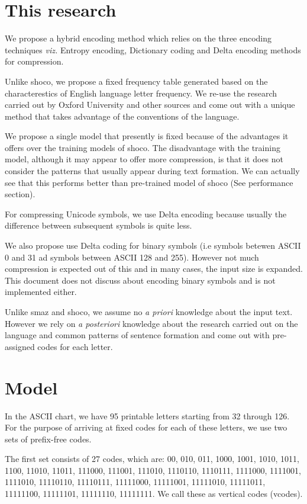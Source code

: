 \documentclass[]{article}
\begin{document}
\section{This research}

We propose a hybrid encoding method which relies on the three encoding techniques \emph{viz.} Entropy encoding, Dictionary coding and Delta encoding methods for compression.

Unlike shoco, we propose a fixed frequency table generated based on the characterestics of English language letter frequency.  We re-use the research carried out by Oxford University \cite{7} and other sources \cite{7} \cite{9} and come out with a unique method that takes advantage of the conventions of the language.

We propose a single model that presently is fixed because of the advantages it offers over the training models of shoco. The disadvantage with the training model, although it may appear to offer more compression, is that it does not consider the patterns that usually appear during text formation. We can actually see that this performs better than pre-trained model of shoco (See performance section).

For compressing Unicode symbols, we use Delta encoding because usually the difference between subsequent symbols is quite less.

We also propose use Delta coding for binary symbols (i.e symbols betewen ASCII 0 and 31 ad symbols between ASCII 128 and 255). However not much compression is expected out of this and in many cases, the input size is expanded.  This document does not discuss about encoding binary symbols and is not implemented either.

Unlike smaz and shoco, we assume no \emph{a priori} knowledge about the input text.  However we rely on \emph{a posteriori} knowledge about the research carried out on the language and common patterns of sentence formation and come out with pre-assigned codes for each letter.

\section{Model}

In the ASCII chart, we have 95 printable letters starting from 32 through 126.  For the purpose of arriving at fixed codes for each of these letters, we use two sets of prefix-free codes.

The first set consists of 27 codes, which are: 00, 010, 011, 1000, 1001, 1010, 1011, 1100, 11010, 11011, 111000, 111001, 111010, 1110110, 1110111, 1111000, 1111001, 1111010, 11110110, 11110111, 11111000, 11111001, 11111010, 11111011, 11111100, 11111101, 11111110, 11111111.  We call these as vertical codes (vcodes).
\end{document}
